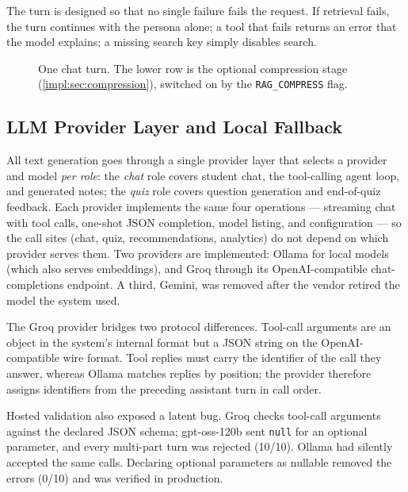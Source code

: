 The turn is designed so that no single failure fails the request. If
retrieval fails, the turn continues with the persona alone; a tool that
fails returns an error that the model explains; a missing search key simply
disables search.

\begin{figure}[htb]
  \centering
  
  \caption{One chat turn. The lower row is the optional compression stage
           (\autoref{impl:sec:compression}), switched on by the
           \texttt{RAG\_COMPRESS} flag.}
  \label{impl:fig:chatturn}
\end{figure}

\subsection{LLM Provider Layer and Local Fallback}
\label{impl:subsec:llm-providers}

All text generation goes through a single provider layer that selects a
provider and model \emph{per role}: the \emph{chat} role covers student chat,
the tool-calling agent loop, and generated notes; the \emph{quiz} role covers
question generation and end-of-quiz feedback. Each provider implements the
same four operations --- streaming chat with tool calls, one-shot JSON
completion, model listing, and configuration --- so the call sites (chat,
quiz, recommendations, analytics) do not depend on which provider serves
them. Two providers are implemented: Ollama for local models (which also
serves embeddings), and Groq through its OpenAI-compatible chat-completions
endpoint. A third, Gemini, was removed after the vendor retired the model the
system used.

The Groq provider bridges two protocol differences. Tool-call arguments are
an object in the system's internal format but a JSON string on the
OpenAI-compatible wire format. Tool replies must carry the identifier of the
call they answer, whereas Ollama matches replies by position; the provider
therefore assigns identifiers from the preceding assistant turn in call
order.

Hosted validation also exposed a latent bug. Groq checks tool-call arguments
against the declared JSON schema; gpt-oss-120b sent \texttt{null} for an
optional parameter, and every multi-part turn was rejected (10/10). Ollama
had silently accepted the same calls. Declaring optional parameters as
nullable removed the errors (0/10) and was verified in production.

